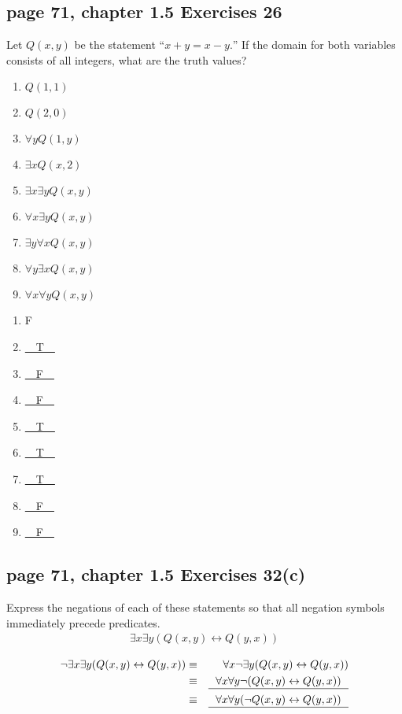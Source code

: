 \documentclass[sigconf]{acmart}
\begin{document}
\subsection{page 71, chapter 1.5 Exercises 26}
\begin{shaded}
    Let $Q(x, y)$ be the statement $“x + y = x - y.”$ If the domain for both variables consists of all integers, what are the truth values?
    \begin{enumerate}[label=(\alph*)]
        \item $Q(1,1)$
        \item $Q(2,0)$
        \item $\forall y Q(1,y)$
        \item $\exists x Q(x,2)$
        \item $\exists x \exists y Q(x,y)$
        \item $\forall x \exists y Q(x,y)$
        \item $\exists y \forall x Q(x,y)$
        \item $\forall y \exists x Q(x,y)$
        \item $\forall x \forall y Q(x,y)$
    \end{enumerate}
\end{shaded} 
\begin{enumerate}[label=(\alph*)]
	\item F
	\item \underline{~~T~~}
	\item \underline{~~F~~}
	\item \underline{~~F~~}
	\item \underline{~~T~~}
	\item \underline{~~T~~}
	\item \underline{~~T~~}
	\item \underline{~~F~~}
	\item \underline{~~F~~}
\end{enumerate}

\subsection{page 71, chapter 1.5 Exercises 32(c)}
\begin{shaded}
    Express the negations of each of these statements so that all negation symbols immediately precede predicates.
    \begin{eqnarray*}
    	\exists x \exists y (Q(x,y) \leftrightarrow Q(y,x))
    \end{eqnarray*}
\end{shaded} 
\begin{eqnarray*}
	\neg \exists x \exists y (Q(x,y) \leftrightarrow Q(y,x)) & \equiv & \forall x \neg \exists y
	(Q(x,y) \leftrightarrow Q(y,x)) \\
	& \equiv & \text{\underline{~~$\forall x \forall y \neg (Q(x,y) \leftrightarrow Q(y,x))$~~}} \\
	& \equiv & \text{\underline{~~$\forall x \forall y (\neg Q(x,y) \leftrightarrow Q(y,x))$~~}}
\end{eqnarray*}
\end{document}
